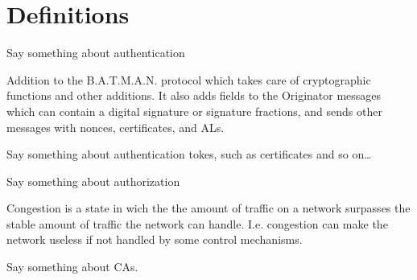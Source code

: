 \chapter*{Definitions}



\begin{acronym}



	Say something about authentication

	Addition to the B.A.T.M.A.N. protocol which takes care of cryptographic
	functions and other additions. It also adds fields to the Originator messages
	which can contain a digital signature or signature fractions, and sends other
	messages with nonces, certificates, and ALs.

	Say something about authentication tokes, such as certificates and so on\ldots

	Say something about authorization

	Congestion is a state in wich the the amount of traffic on a network surpasses
	the stable amount of traffic the network can handle. I.e. congestion can make
	the network useless if not handled by some control mechanisms.
	
	Say something about CAs.





\end{acronym}
